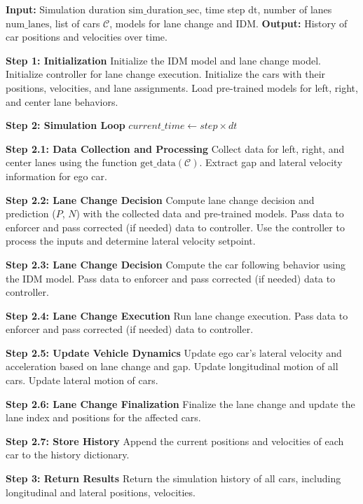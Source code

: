 \begin{algorithm}[htbp]
    \caption{Autonomous Vehicle Simulation and Lane Change Model}
    \begin{algorithmic}[1]
    \State \textbf{Input:} Simulation duration $\text{sim\_duration\_sec}$, time step $\text{dt}$, number of lanes $\text{num\_lanes}$, list of cars $\mathcal{C}$, models for lane change and IDM.
    \State \textbf{Output:} History of car positions and velocities over time.
    
    \State \textbf{Step 1: Initialization}
    \State Initialize the IDM model and lane change model.
    \State Initialize controller for lane change execution.
    \State Initialize the cars with their positions, velocities, and lane assignments.
    \State Load pre-trained models for left, right, and center lane behaviors.
    
    \State \textbf{Step 2: Simulation Loop}
        \State $current\_time \gets step \times dt$
        
        \State \textbf{Step 2.1: Data Collection and Processing}
        \State Collect data for left, right, and center lanes using the function $\text{get\_data}(\mathcal{C})$.
        \State Extract gap and lateral velocity information for ego car.
        
        \State \textbf{Step 2.2: Lane Change Decision}
        \State Compute lane change decision and prediction ($P$, $N$) with the collected data and pre-trained models.
        \State Pass data to enforcer and pass corrected (if needed) data to controller.
        \State Use the controller to process the inputs and determine lateral velocity setpoint.

        \State \textbf{Step 2.3: Lane Change Decision}
        \State Compute the car following behavior using the IDM model.
        \State Pass data to enforcer and pass corrected (if needed) data to controller.
        
        \State \textbf{Step 2.4: Lane Change Execution}
        \State Run lane change execution.
        \State Pass data to enforcer and pass corrected (if needed) data to controller.
        
        \State \textbf{Step 2.5: Update Vehicle Dynamics}
        \State Update ego car's lateral velocity and acceleration based on lane change and gap.
        \State Update longitudinal motion of all cars.
        \State Update lateral motion of cars.
        
        \State \textbf{Step 2.6: Lane Change Finalization}
            \State Finalize the lane change and update the lane index and positions for the affected cars.
        \EndIf
        
        \State \textbf{Step 2.7: Store History}
        \State Append the current positions and velocities of each car to the history dictionary.
    \EndFor
    
    \State \textbf{Step 3: Return Results}
    \State Return the simulation history of all cars, including longitudinal and lateral positions, velocities.
    \end{algorithmic}
\end{algorithm}


